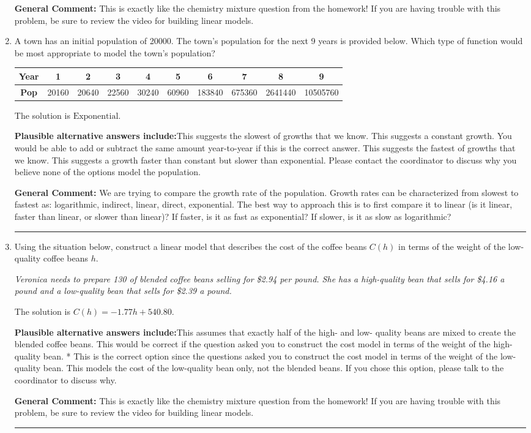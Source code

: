\documentclass{extbook}[14pt]
\newcommand{\litem}[1]{\item #1

\rule{\textwidth}{0.4pt}}
\begin{document}
\begin{enumerate}
{\textbf{General Comment:} This is exactly like the chemistry mixture question from the homework! If you are having trouble with this problem, be sure to review the video for building linear models.
}
\litem{
A town has an initial population of 20000. The town's population for the next 9 years is provided below. Which type of function would be most appropriate to model the town's population?


\begin{tabular}{c|c|c|c|c|c|c|c|c|c}
\textbf{Year} &1 &2 &3 &4 &5 &6 &7 &8 &9\tabularnewline \hline
\textbf{Pop} &20160 &20640 &22560 &30240 &60960 &183840 &675360 &2641440 &10505760\end{tabular}The solution is \( \text{Exponential} \).\begin{enumerate}[label=\Alph*.]
\textbf{Plausible alternative answers include:}This suggests the slowest of growths that we know.
This suggests a constant growth. You would be able to add or subtract the same amount year-to-year if this is the correct answer.
This suggests the fastest of growths that we know.
This suggests a growth faster than constant but slower than exponential.
Please contact the coordinator to discuss why you believe none of the options model the population.
\end{enumerate}

\textbf{General Comment:} We are trying to compare the growth rate of the population. Growth rates can be characterized from slowest to fastest as: logarithmic, indirect, linear, direct, exponential. The best way to approach this is to first compare it to linear (is it linear, faster than linear, or slower than linear)? If faster, is it as fast as exponential? If slower, is it as slow as logarithmic?
}
\litem{
Using the situation below, construct a linear model that describes the cost of the coffee beans $C(h)$ in terms of the weight of the low-quality coffee beans $h$.

\begin{center}
    \textit{ Veronica needs to prepare 130 of blended coffee beans selling for \$2.94 per pound. She has a high-quality bean that sells for \$4.16 a pound and a low-quality bean that sells for \$2.39 a pound. }
\end{center}
The solution is \( C(h) = -1.77 h + 540.80 \).\begin{enumerate}[label=\Alph*.]
\textbf{Plausible alternative answers include:}This assumes that exactly half of the high- and low- quality beans are mixed to create the blended coffee beans.
This would be correct if the question asked you to construct the cost model in terms of the weight of the high-quality bean.
* This is the correct option since the questions asked you to construct the cost model in terms of the weight of the low-quality bean.
This models the cost of the low-quality bean only, not the blended beans.
If you chose this option, please talk to the coordinator to discuss why.
\end{enumerate}

\textbf{General Comment:} This is exactly like the chemistry mixture question from the homework! If you are having trouble with this problem, be sure to review the video for building linear models.
}
\end{enumerate}
\end{document}
